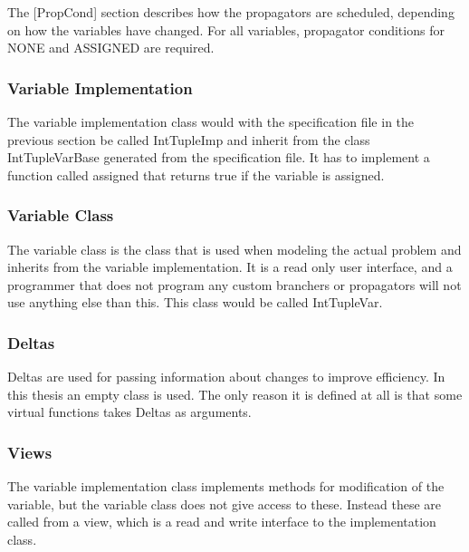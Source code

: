 \documentclass[a4paper,11pt]{article}
\begin{document}
The [PropCond] section describes how the propagators are scheduled, depending on how the variables have changed. For all variables, propagator conditions for NONE and ASSIGNED are required.

\subsubsection{Variable Implementation}
The variable implementation class would with the specification file in the previous section be called IntTupleImp and inherit from the class IntTupleVarBase generated from the specification file. It has to implement a function called assigned that returns true if the variable is assigned.
\subsubsection{Variable Class}
The variable class is the class that is used when modeling the actual problem and inherits from the variable implementation. It is a read only user interface, and a programmer that does not program any custom branchers or propagators will not use anything else than this. This class would be called IntTupleVar.
\subsubsection{Deltas}
Deltas are used for passing information about changes to improve efficiency. In this thesis an empty class is used. The only reason it is defined at all is that some virtual functions takes Deltas as arguments.

\subsubsection{Views}
The variable implementation class implements methods for modification of the variable, but the variable class does not give access to these. Instead these are called from a view, which is a read and write interface to the implementation class.
\end{document}
